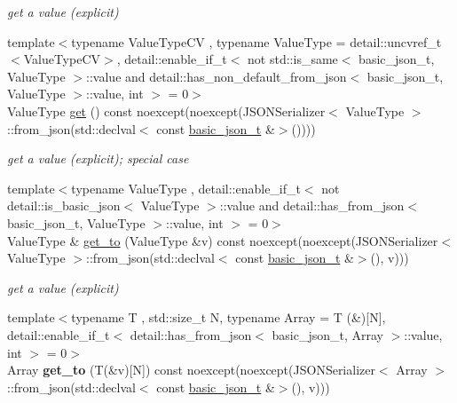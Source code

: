 \begin{DoxyCompactItemize}
\begin{DoxyCompactList}\small\item\em get a value (explicit) \end{DoxyCompactList}\item 
{\footnotesize template$<$typename Value\+Type\+CV , typename Value\+Type  = detail\+::uncvref\+\_\+t$<$\+Value\+Type\+C\+V$>$, detail\+::enable\+\_\+if\+\_\+t$<$ not std\+::is\+\_\+same$<$ basic\+\_\+json\+\_\+t, Value\+Type $>$\+::value and detail\+::has\+\_\+non\+\_\+default\+\_\+from\+\_\+json$<$ basic\+\_\+json\+\_\+t, Value\+Type $>$\+::value, int $>$  = 0$>$ }\\Value\+Type \mbox{\hyperlink{classnlohmann_1_1basic__json_a32a3ee3b99cc5d3ba67bc52148e98cb5}{get}} () const noexcept(noexcept(J\+S\+O\+N\+Serializer$<$ Value\+Type $>$\+::from\+\_\+json(std\+::declval$<$ const \mbox{\hyperlink{classnlohmann_1_1basic__json_afff7860310ae69f29f8158a77ec0ef13}{basic\+\_\+json\+\_\+t}} \&$>$())))
\begin{DoxyCompactList}\small\item\em get a value (explicit); special case \end{DoxyCompactList}\item 
{\footnotesize template$<$typename Value\+Type , detail\+::enable\+\_\+if\+\_\+t$<$ not detail\+::is\+\_\+basic\+\_\+json$<$ Value\+Type $>$\+::value and detail\+::has\+\_\+from\+\_\+json$<$ basic\+\_\+json\+\_\+t, Value\+Type $>$\+::value, int $>$  = 0$>$ }\\Value\+Type \& \mbox{\hyperlink{classnlohmann_1_1basic__json_a8a3db7d78f74232d3a6fb8f1abf69709}{get\+\_\+to}} (Value\+Type \&v) const noexcept(noexcept(J\+S\+O\+N\+Serializer$<$ Value\+Type $>$\+::from\+\_\+json(std\+::declval$<$ const \mbox{\hyperlink{classnlohmann_1_1basic__json_afff7860310ae69f29f8158a77ec0ef13}{basic\+\_\+json\+\_\+t}} \&$>$(), v)))
\begin{DoxyCompactList}\small\item\em get a value (explicit) \end{DoxyCompactList}\item 
\mbox{\label{classnlohmann_1_1basic__json_a876574a690f53fce737318faa966a697}} 
{\footnotesize template$<$typename T , std\+::size\+\_\+t N, typename Array  = T (\&)\mbox{[}\+N\mbox{]}, detail\+::enable\+\_\+if\+\_\+t$<$ detail\+::has\+\_\+from\+\_\+json$<$ basic\+\_\+json\+\_\+t, Array $>$\+::value, int $>$  = 0$>$ }\\Array {\bfseries get\+\_\+to} (T(\&v)\mbox{[}N\mbox{]}) const noexcept(noexcept(J\+S\+O\+N\+Serializer$<$ Array $>$\+::from\+\_\+json(std\+::declval$<$ const \mbox{\hyperlink{classnlohmann_1_1basic__json_afff7860310ae69f29f8158a77ec0ef13}{basic\+\_\+json\+\_\+t}} \&$>$(), v)))

\end{DoxyCompactItemize}
